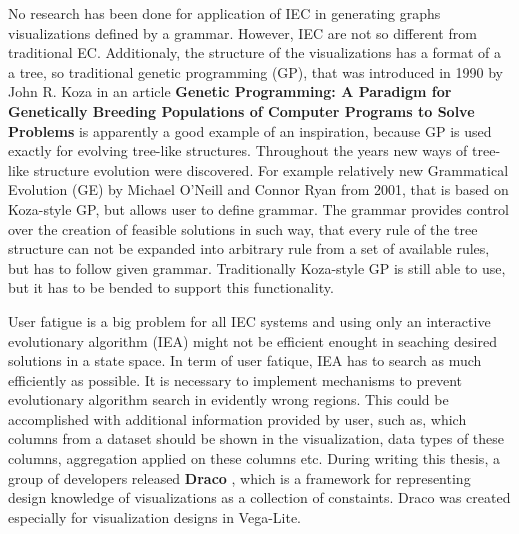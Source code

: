 No research has been done for application of IEC in generating graphs visualizations defined by a grammar. However, IEC are not so different from traditional EC. Additionaly, the structure of the visualizations has a format of a a tree, so traditional genetic programming (GP), that was introduced in 1990 by John R. Koza in an article \textbf{Genetic Programming: A Paradigm for Genetically Breeding Populations of Computer Programs to Solve Problems} \cite{genetic-programming} is apparently a good example of an inspiration, because GP is used exactly for evolving tree-like structures. Throughout the years new ways of tree-like structure evolution were discovered. For example relatively new Grammatical Evolution (GE) \cite{grammatical-evolution} by Michael O'Neill and Connor Ryan from 2001, that is based on Koza-style GP, but allows user to define grammar. The grammar provides control over the creation of feasible solutions in such way, that every rule of the tree structure can not be expanded into arbitrary rule from a set of available rules, but has to follow given grammar. Traditionally Koza-style GP is still able to use, but it has to be bended to support this functionality.

User fatigue is a big problem for all IEC systems and using only an interactive evolutionary algorithm (IEA) might not be efficient enought in seaching desired solutions in a state space. In term of user fatique, IEA has to search as much efficiently as possible. It is necessary to implement mechanisms to prevent evolutionary algorithm search in evidently wrong regions. This could be accomplished with additional information provided by user, such as, which columns from a dataset should be shown in the visualization, data types of these columns, aggregation applied on these columns etc. During writing this thesis, a group of developers released \textbf{Draco} \cite{draco}, which is a framework for representing design knowledge of visualizations as a collection of constaints. Draco was created especially for visualization designs in Vega-Lite.

